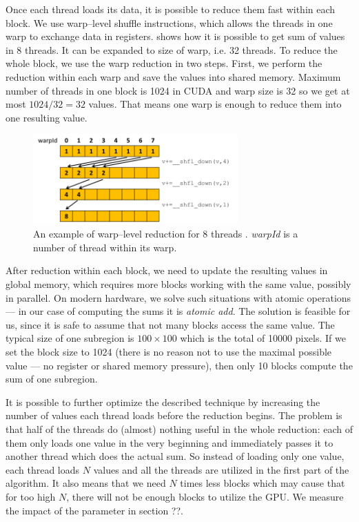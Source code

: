 Once each thread loads its data, it is possible to reduce them fast within each block. We use warp--level shuffle instructions, which allows the threads in one warp to exchange data in registers.  shows how it is possible to get sum of values in 8 threads. It can be expanded to size of warp, i.e. 32 threads. To reduce the whole block, we use the warp reduction in two steps. First, we perform the reduction within each warp and save the values into shared memory. Maximum number of threads in one block is 1024 in CUDA and warp size is 32 so we get at most $1024/32 = 32$ values. That means one warp is enough to reduce them into one resulting value.

\begin{figure}
	\centering
	\includegraphics[width=0.7\textwidth]{img/warp_reduce}
	\caption{An example of warp--level reduction for 8 threads \cite{parallelReduction}. \emph{warpId} is a number of thread within its warp.}
	\label{warp_reduce}
\end{figure}

After reduction within each block, we need to update the resulting values in global memory, which requires more blocks working with the same value, possibly in parallel. On modern hardware, we solve such situations with atomic operations --- in our case of computing the sums it is \emph{atomic add}. The solution is feasible for us, since it is safe to assume that not many blocks access the same value. The typical size of one subregion is $100 \times 100$ which is the total of 10000 pixels. If we set the block size to 1024 (there is no reason not to use the maximal possible value --- no register or shared memory pressure), then only 10 blocks compute the sum of one subregion.

It is possible to further optimize the described technique by increasing the number of values each thread loads before the reduction begins. The problem is that half of the threads do (almost) nothing useful in the whole reduction: each of them only loads one value in the very beginning and immediately passes it to another thread which does the actual sum. So instead of loading only one value, each thread loads $N$ values and all the threads are utilized in the first part of the algorithm. It also means that we need $N$ times less blocks which may cause that for too high $N$, there will not be enough blocks to utilize the GPU. We measure the impact of the parameter in section ??.



